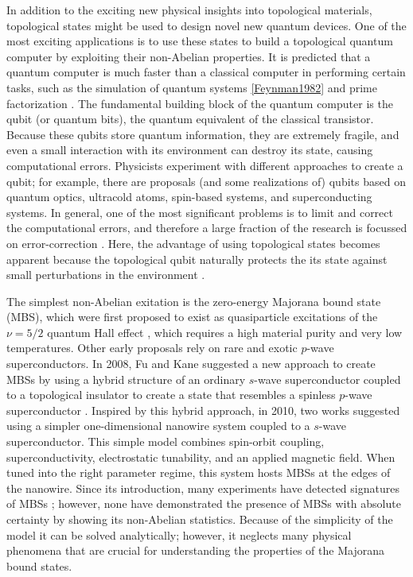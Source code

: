 In addition to the exciting new physical insights into topological materials, topological states might be used to design novel new quantum devices.
One of the most exciting applications is to use these states to build a topological quantum computer by exploiting their non-Abelian properties.
It is predicted that a quantum computer is much faster than a classical computer in performing certain tasks, such as the simulation of quantum systems \ref{Feynman1982} and prime factorization \cite{Shor1994}.
The fundamental building block of the quantum computer is the qubit (or quantum bits), the quantum equivalent of the classical transistor.
Because these qubits store quantum information, they are extremely fragile, and even a small interaction with its environment can destroy its state, causing computational errors.
Physicists experiment with different approaches to create a qubit; for example, there are proposals (and some realizations of) qubits based on quantum optics, ultracold atoms, spin-based systems, and superconducting systems.
In general, one of the most significant problems is to limit and correct the computational errors, and therefore a large fraction of the research is focussed on error-correction \cite{Lidar2013}.
Here, the advantage of using topological states becomes apparent because the topological qubit naturally protects the its state against small perturbations in the environment \cite{Nayak2008}.

The simplest non-Abelian exitation is the zero-energy Majorana bound state (MBS), which were first proposed to exist as quasiparticle excitations of the $\nu = 5/2$ quantum Hall effect \cite{Read2000,Moore1991}, which requires a high material purity and very low temperatures.
Other early proposals \cite{Gurarie2005,Sarma2006,Tewari2007} rely on rare and exotic $p$-wave superconductors.
In 2008, Fu and Kane suggested a new approach to create MBSs by using a hybrid structure of an ordinary $s$-wave superconductor coupled to a topological insulator to create a state that resembles a spinless $p$-wave superconductor \cite{Fu2008}.
Inspired by this hybrid approach, in 2010, two works \cite{Lutchyn2010,Oreg2010} suggested using a simpler one-dimensional nanowire system coupled to a $s$-wave superconductor.
This simple model combines spin-orbit coupling, superconductivity, electrostatic tunability, and an applied magnetic field.
When tuned into the right parameter regime, this system hosts MBSs at the edges of the nanowire.
Since its introduction, many experiments have detected signatures of MBSs \cite{Mourik2012,Das2012,Deng2012,Deng2016,Deng2016a,Chen2017}; however, none have demonstrated the presence of MBSs with absolute certainty by showing its non-Abelian statistics.
Because of the simplicity of the model it can be solved analytically; however, it neglects many physical phenomena that are crucial for understanding the properties of the Majorana bound states.


